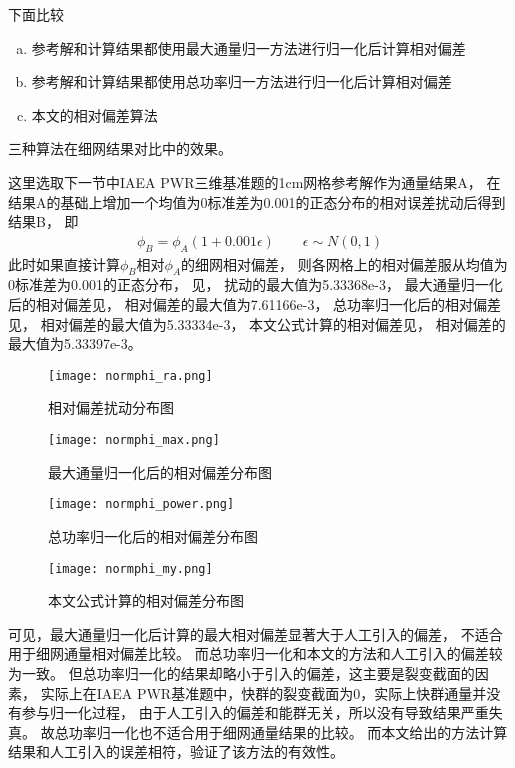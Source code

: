 下面比较
\begin{enumerate}[a)]
\item 参考解和计算结果都使用最大通量归一方法进行归一化后计算相对偏差
\item 参考解和计算结果都使用总功率归一方法进行归一化后计算相对偏差
\item 本文的相对偏差算法
\end{enumerate}
三种算法在细网结果对比中的效果。

这里选取下一节中IAEA PWR三维基准题的1cm网格参考解作为通量结果A，
在结果A的基础上增加一个均值为0标准差为0.001的正态分布的相对误差扰动后得到结果B，
即
\begin{align}
  \phi_B = \phi_A (1+0.001\epsilon) \qquad \epsilon \sim N(0,1)
\end{align}
此时如果直接计算$\phi_B$相对$\phi_A$的细网相对偏差，
则各网格上的相对偏差服从均值为0标准差为0.001的正态分布，
见，
扰动的最大值为5.33368e-3，
最大通量归一化后的相对偏差见，
相对偏差的最大值为7.61166e-3，
总功率归一化后的相对偏差见，
相对偏差的最大值为5.33334e-3，
本文公式计算的相对偏差见，
相对偏差的最大值为5.33397e-3。

\begin{figure}
\centering
\texttt{[image: normphi\_ra.png]}
\caption{相对偏差扰动分布图\label{fig:testresult.normphi.ra}}
\end{figure}

\begin{figure}
\centering
\texttt{[image: normphi\_max.png]}
\caption{最大通量归一化后的相对偏差分布图\label{fig:testresult.normphi.max}}
\end{figure}

\begin{figure}
\centering
\texttt{[image: normphi\_power.png]}
\caption{总功率归一化后的相对偏差分布图\label{fig:testresult.normphi.power}}
\end{figure}

\begin{figure}
\centering
\texttt{[image: normphi\_my.png]}
\caption{本文公式计算的相对偏差分布图\label{fig:testresult.normphi.my}}
\end{figure}

可见，最大通量归一化后计算的最大相对偏差显著大于人工引入的偏差，
不适合用于细网通量相对偏差比较。
而总功率归一化和本文的方法和人工引入的偏差较为一致。
但总功率归一化的结果却略小于引入的偏差，这主要是裂变截面的因素，
实际上在IAEA PWR基准题中，快群的裂变截面为0，实际上快群通量并没有参与归一化过程，
由于人工引入的偏差和能群无关，所以没有导致结果严重失真。
故总功率归一化也不适合用于细网通量结果的比较。
而本文给出的方法计算结果和人工引入的误差相符，验证了该方法的有效性。


